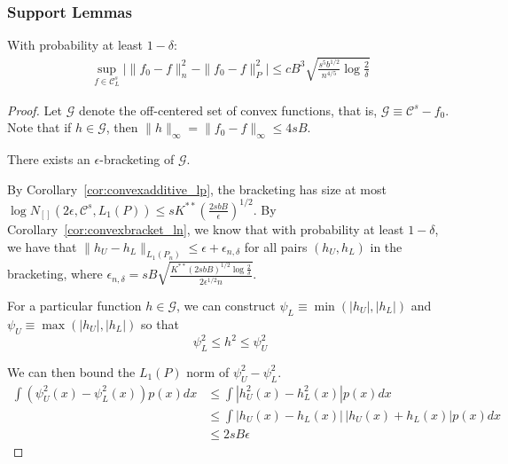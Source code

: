 \subsubsection{Support Lemmas}


\begin{lemma}
\label{lem:uniform_convergence}
With probability at least $1-\delta$:
\begin{align*}
\sup_{f \in \mathcal{C}^s_L} \Big| \| f_0 - f \|^2_n - \|f_0 - f \|^2_P\Big| \leq
   c B^3 \sqrt{ \frac{s^5b^{1/2}}{n^{4/5}} \log \frac{2}{\delta}}
\end{align*}
\end{lemma}

\begin{proof}
Let $\mathcal{G}$ denote the off-centered set of convex functions, that is, $\mathcal{G} \equiv \mathcal{C}^s - f_0$. Note that if $h \in \mathcal{G}$, then $\| h \|_\infty = \| f_0 - f \|_\infty \leq 4 s B$.

There exists an $\epsilon$-bracketing of $\mathcal{G}$. 


By Corollary~\ref{cor:convexadditive_lp}, the bracketing has size at most $\log N_{[]}(2\epsilon, \mathcal{C}^s, L_1(P)) \leq s K^{**}\left( \frac{2sbB}{\epsilon} \right)^{1/2}$. By Corollary~\ref{cor:convexbracket_ln}, we know that with probability at least $1-\delta$, we have that $\|h_U - h_L\|_{L_1(P_n)} \leq \epsilon + \epsilon_{n,\delta}$ for all pairs $(h_U, h_L)$ in the bracketing, where $\epsilon_{n,\delta} = sB \sqrt{ \frac{K^{**} (2sbB)^{1/2} \log \frac{2}{\delta}}{2 \epsilon^{1/2} n}}$.

For a particular function $h \in \mathcal{G}$, we can construct $\psi_L \equiv \min( |h_U|, |h_L|)$ and $\psi_U \equiv \max( |h_U|, |h_L| )$ so that
\[
\psi_L^2 \leq h^2 \leq \psi_U^2
\]

We can then bound the $L_1(P)$ norm of $\psi_U^2 - \psi_L^2$.
\begin{align*}
\int (\psi_U^2(x) - \psi_L^2(x)) p(x)dx  &\leq  \int | h_U^2(x) - h_L^2(x)| p(x) dx \\
   &\leq \int | h_U(x) - h_L(x) | \, |h_U(x) + h_L(x)| p(x) dx \\
   &\leq 2sB \epsilon
\end{align*}


\end{proof}
